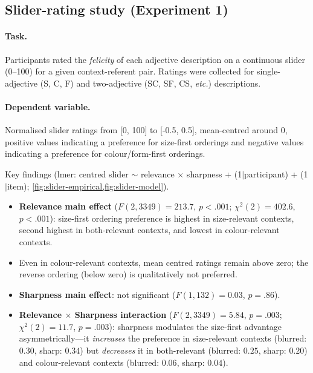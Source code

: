 \documentclass[11pt, a4paper]{article}
\newcommand{\etc}{\textit{etc.}}
\newcommand{\utter}[1]{\textsf{#1}} %
\begin{document}
\subsection{Slider-rating study (Experiment 1)}
\label{sec:exp:slider}

\paragraph{Task.}  Participants rated the \emph{felicity} of each adjective description on a continuous slider (0--100) for a given context-referent pair.
Ratings were collected for single-adjective (\utter{S}, \utter{C}, \utter{F}) and two-adjective (\utter{SC}, \utter{SF}, \utter{CS}, \etc) descriptions.

\paragraph{Dependent variable.}  Normalised slider ratings from [0, 100] to [-0.5, 0.5], mean-centred around 0, positive values indicating a preference for size-first orderings and negative values indicating a preference for colour/form-first orderings. 

\begin{discussbox}{Key findings (lmer: centred slider $\sim$ relevance $\times$ sharpness + (1$|$participant) + (1$|$item); \cref{fig:slider-empirical,fig:slider-model}).}
\begin{itemize}[leftmargin=*]
  \item \textbf{Relevance main effect} ($F(2, 3349) = 213.7$, $p < .001$; $\chi^2(2) = 402.6$, $p < .001$): size-first ordering preference is highest in size-relevant contexts, second highest in both-relevant contexts, and lowest in colour-relevant contexts.
  \item Even in colour-relevant contexts, mean centred ratings remain above zero; the reverse ordering (below zero) is qualitatively not preferred.
  \item \textbf{Sharpness main effect}: not significant ($F(1, 132) = 0.03$, $p = .86$).
  \item \textbf{Relevance $\times$ Sharpness interaction} ($F(2, 3349) = 5.84$, $p = .003$; $\chi^2(2) = 11.7$, $p = .003$): sharpness modulates the size-first advantage asymmetrically---it \emph{increases} the preference in size-relevant contexts (blurred: $0.30$, sharp: $0.34$) but \emph{decreases} it in both-relevant (blurred: $0.25$, sharp: $0.20$) and colour-relevant contexts (blurred: $0.06$, sharp: $0.04$).
\end{itemize}
\end{discussbox}
\end{document}
